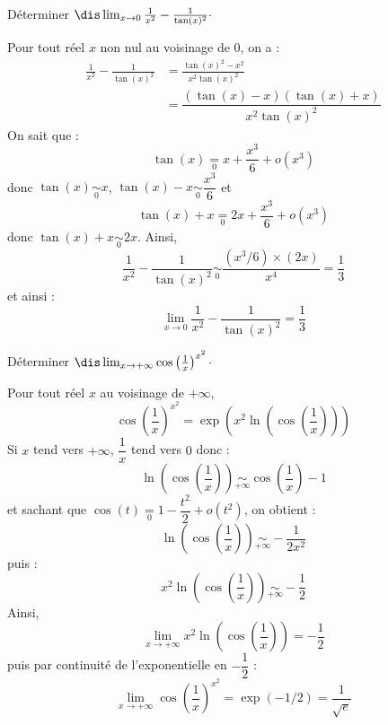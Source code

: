 \documentclass[a4paper,10pt]{report}
\begin{document}
\begin{Exercice}{} Déterminer $\dis \lim_{x \rightarrow 0} \frac{1}{x^2} - \frac{1}{\tan(x)^2} \cdot$
\end{Exercice} 

\corr Pour tout réel $x$ non nul au voisinage de $0$, on a :
\begin{align*}
\frac{1}{x^2} - \frac{1}{\tan(x)^2} & = \frac{\tan(x)^2-x^2}{x^2 \tan(x)^2} \\
& = \dfrac{(\tan(x)-x)(\tan(x)+x)}{x^2 \tan(x)^2} 
\end{align*}
On sait que :
$$ \tan(x) \underset{0}{=} x + \dfrac{x^3}{6} + o(x^3)$$
donc $\tan(x) \underset{0}{\sim} x$, $\tan(x)-x \underset{0}{\sim} \dfrac{x^3}{6}$ et 
$$ \tan(x)+x \underset{0}{=} 2x + \dfrac{x^3}{6} + o(x^3)$$
donc $\tan(x)+x \underset{0}{\sim} 2x$. Ainsi,
$$ \frac{1}{x^2} - \frac{1}{\tan(x)^2} \underset{0}{\sim} \dfrac{(x^3/6) \times(2x)}{x^4} = \dfrac{1}{3}$$
et ainsi :
$$ \lim_{x \rightarrow 0} \frac{1}{x^2} - \frac{1}{\tan(x)^2} = \dfrac{1}{3}$$

\medskip

\begin{Exercice}{} Déterminer $\dis \lim_{x \rightarrow + \infty}  \cos \left( \frac{1}{x} \right)^{x^2} \cdot$
\end{Exercice}

\corr Pour tout réel $x$ au voisinage de $+ \infty$,
$$ \cos \left( \frac{1}{x} \right)^{x^2} = \exp \left(x^2 \ln \left( \cos \left( \dfrac{1}{x} \right) \right) \right)$$
Si $x$ tend vers $+ \infty$, $\dfrac{1}{x}$ tend vers $0$ donc :
$$ \ln \left( \cos \left( \dfrac{1}{x} \right) \right) \underset{+ \infty}{\sim} \cos \left( \dfrac{1}{x} \right) - 1 $$
et sachant que $\cos(t) \underset{0}{=} 1 - \dfrac{t^2}{2}+ o(t^2)$, on obtient :
$$  \ln \left( \cos \left( \dfrac{1}{x} \right) \right) \underset{+ \infty}{\sim} - \dfrac{1}{2x^2}$$
puis :
$$ x^2 \ln \left( \cos \left( \dfrac{1}{x} \right) \right) \underset{+ \infty}{\sim} - \dfrac{1}{2}$$
Ainsi,
$$ \lim_{x \rightarrow + \infty} x^2 \ln \left( \cos \left( \dfrac{1}{x} \right) \right) = -\dfrac{1}{2}$$
puis par continuité de l'exponentielle en $-\dfrac{1}{2}$ :
$$ \lim_{x \rightarrow + \infty}  \cos \left( \frac{1}{x} \right)^{x^2} = \exp(-1/2) = \dfrac{1}{\sqrt{e}}$$

\medskip
\end{document}
